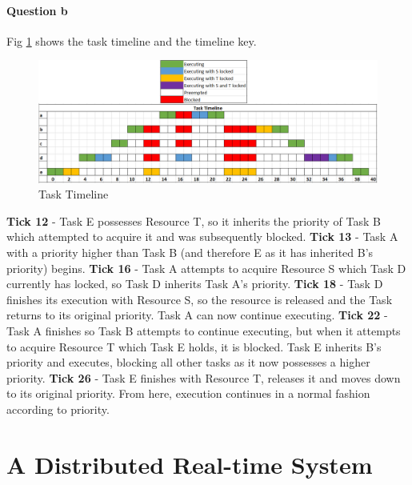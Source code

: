 \documentclass[]{report}
\begin{document}
			\subsubsection{Question b}
			Fig \ref{fig:tasktimeline} shows the task timeline and the timeline key.
			\begin{figure}[h!]
				\centering
				\includegraphics[scale=0.3]{tasktimeline.png}
				\caption{Task Timeline}
				\label{fig:tasktimeline}
			\end{figure}
			\newline
			\textbf{Tick 12} - Task E possesses Resource T, so it inherits the priority of Task B which attempted to acquire it and was subsequently blocked. \newline
			\textbf{Tick 13} - Task A with a priority higher than Task B (and therefore E as it has inherited B's priority) begins. \newline
			\textbf{Tick 16} - Task A attempts to acquire Resource S which Task D currently has locked, so Task D inherits Task A's priority. \newline
			\textbf{Tick 18} - Task D finishes its execution with Resource S, so the resource is released and the Task returns to its original priority. Task A can now continue executing. \newline
			\textbf{Tick 22} - Task A finishes so Task B attempts to continue executing, but when it attempts to acquire Resource T which Task E holds, it is blocked. Task E inherits B's priority and executes, blocking all other tasks as it now possesses a higher priority. \newline
			\textbf{Tick 26} - Task E finishes with Resource T, releases it and moves down to its original priority. From here, execution continues in a normal fashion according to priority. \newline
	
	\chapter{A Distributed Real-time System}
\end{document}
